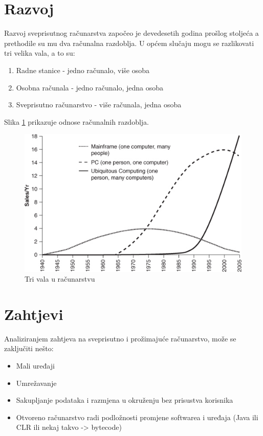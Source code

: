 \documentclass[times, utf8, diplomski, numeric]{fer}
\begin{document}
\section{Razvoj}
Razvoj sveprisutnog računarstva započeo je devedesetih godina prošlog stoljeća
a prethodile su mu dva računalna razdoblja. U općem slučaju mogu se razlikovati
tri velika vala, a to su:
\begin{enumerate}
  \item Radne stanice  - jedno računalo, više osoba
  \item Osobna računala  - jedno računalo, jedna
  osoba
  \item Sveprisutno računarstvo  - više računala,
  jedna osoba
\end{enumerate}

Slika \ref{fig:majortrends} prikazuje odnose računalnih razdoblja.

\begin{figure}[!htb]
	\centering
	\includegraphics[width=12cm]{images/majortrends2.png}
	\caption{Tri vala u računarstvu}
	\label{fig:majortrends}
\end{figure}



\section{Zahtjevi}
Analiziranjem zahtjeva na sveprisutno i prožimajuće računarstvo, može se
zaključiti nešto:
\begin{itemize}
  \item Mali uređaji
  \item Umrežavanje
  \item Sakupljanje podataka i razmjena u okruženju bez prisustva korisnika
  \item Otvoreno računarstvo radi podložnosti promjene softwarea i uređaja
  (Java ili CLR ili nekaj takvo -> bytecode)
\end{itemize}
\end{document}
